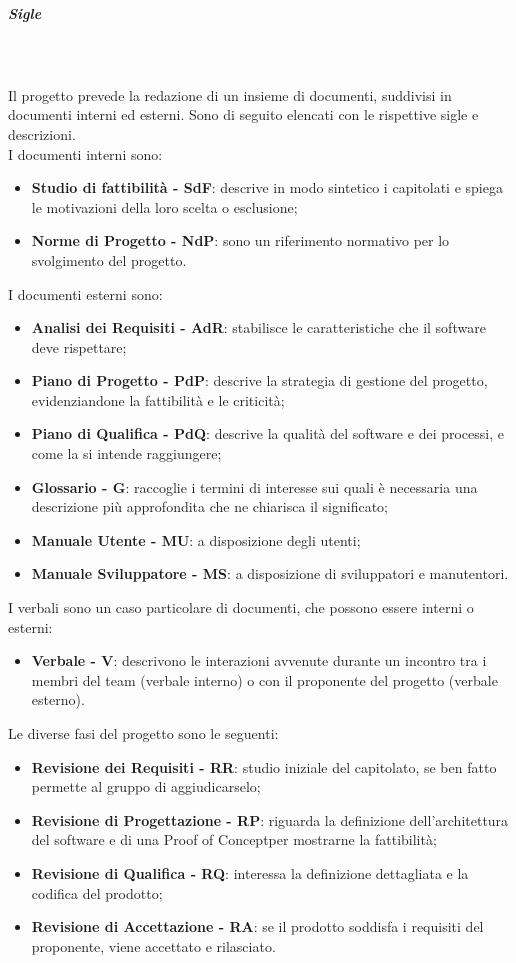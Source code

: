 \subparagraph*{Sigle}\mbox{} \\ \mbox{} \\
Il progetto prevede la redazione di un insieme di documenti, suddivisi in documenti interni ed esterni. Sono di seguito elencati con le rispettive sigle e descrizioni. \\
I documenti interni sono: \begin{itemize}
\item \textbf{Studio di fattibilità - SdF}: descrive in modo sintetico i capitolati e spiega le motivazioni della loro scelta o esclusione;
\item \textbf{Norme di Progetto - NdP}: sono un riferimento normativo per lo svolgimento del progetto.
\end{itemize}
I documenti esterni sono: \begin{itemize}
\item \textbf{Analisi dei Requisiti - AdR}: stabilisce le caratteristiche che il software deve rispettare; 
\item \textbf{Piano di Progetto - PdP}: descrive la strategia di gestione del progetto, evidenziandone la fattibilità e le criticità;
\item \textbf{Piano di Qualifica - PdQ}: descrive la qualità del software e dei processi, e come la si intende raggiungere;
\item \textbf{Glossario - G}: raccoglie i termini di interesse sui quali è necessaria una descrizione più approfondita che ne chiarisca il significato;
\item \textbf{Manuale Utente - MU}: a disposizione degli utenti;
\item \textbf{Manuale Sviluppatore - MS}: a disposizione di sviluppatori e manutentori.
\end{itemize}
I verbali sono un caso particolare di documenti, che possono essere interni o esterni:
\begin{itemize}
\item \textbf{Verbale - V}: descrivono le interazioni avvenute durante un incontro tra i membri del team (verbale interno) o con il proponente del progetto (verbale esterno).
\end{itemize} 
Le diverse fasi del progetto sono le seguenti:
\begin{itemize}
\item \textbf{Revisione dei Requisiti - RR}: studio iniziale del capitolato, se ben fatto permette al gruppo di aggiudicarselo;
\item \textbf{Revisione di Progettazione - RP}: riguarda la definizione dell'architettura del software e di una Proof of Concept\glo per mostrarne la fattibilità;
\item \textbf{Revisione di Qualifica - RQ}: interessa la definizione dettagliata e la codifica del prodotto;
\item \textbf{Revisione di Accettazione - RA}: se il prodotto soddisfa i requisiti del proponente, viene accettato e rilasciato.
\end{itemize}

